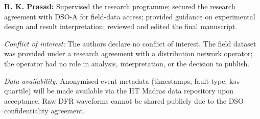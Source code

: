 \documentclass[11pt,a4paper]{article}
\begin{document}
\textbf{R. K. Prasad:} Supervised the research programme; secured the
research agreement with DSO-A for field-data access; provided guidance on
experimental design and result interpretation; reviewed and edited the
final manuscript.

\bigskip
\noindent\textit{Conflict of interest:} The authors declare no conflict of
interest.  The field dataset was provided under a research agreement with
a distribution network operator; the operator had no role in analysis,
interpretation, or the decision to publish.

\bigskip
\noindent\textit{Data availability:} Anonymised event metadata (timestamps,
fault type, k$_{\rm ibr}$ quartile) will be made available via the IIT
Madras data repository upon acceptance.  Raw DFR waveforms cannot be
shared publicly due to the DSO confidentiality agreement.
\end{document}
